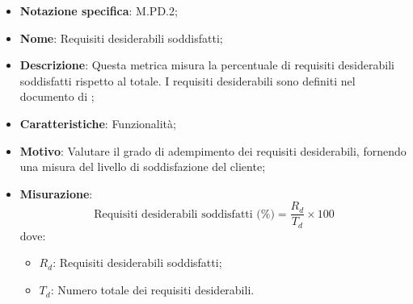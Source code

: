 \begin{itemize}
    \item \textbf{Notazione specifica}: M.PD.2;
    \item \textbf{Nome}: Requisiti desiderabili soddisfatti;
    \item \textbf{Descrizione}: Questa metrica misura la percentuale di requisiti desiderabili soddisfatti rispetto al totale. I requisiti desiderabili sono definiti nel documento di \VersioneAR;
    \item \textbf{Caratteristiche}: Funzionalità;
    \item \textbf{Motivo}: Valutare il grado di adempimento dei requisiti desiderabili, fornendo una misura del livello di soddisfazione del cliente;
    \item \textbf{Misurazione}:
    \[
    \text{Requisiti desiderabili soddisfatti (\%)} = \frac{R_{d}}{T_{d}} \times 100
    \]
    dove:
    \begin{itemize}
        \item $R_{d}$: Requisiti desiderabili soddisfatti;
        \item $T_{d}$: Numero totale dei requisiti desiderabili.
    \end{itemize}
\end{itemize}
